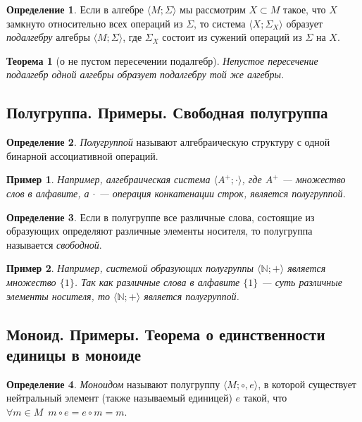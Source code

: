 \documentclass{article}
\newtheorem*{theorem*}{Теорема}
\theoremstyle{plain}
\newtheorem*{example*}{Пример}
\theoremstyle{definition}
\newtheorem{definition}{Определение}[subsection]
\begin{document}
\begin{definition}
	Если в алгебре \(\langle M; \Sigma \rangle\) мы рассмотрим \(X \subset M\) такое, что \(X\) замкнуто относительно всех операций из \(\Sigma\), то система \(\langle X; \Sigma_X \rangle\) образует \textit{подалгебру} алгебры \(\langle M; \Sigma \rangle\), где \(\Sigma_X\) состоит из сужений операций из \(\Sigma\) на \(X\).
\end{definition}

\begin{theorem*}[о не пустом пересечении подалгебр]
	Непустое пересечение подалгебр одной алгебры образует подалгебру той же алгебры.
\end{theorem*}

\subsection{Полугруппа. Примеры. Свободная полугруппа}

\begin{definition}
	\textit{Полугруппой} называют алгебраическую структуру с одной бинарной ассоциативной операций.
\end{definition}

\begin{example*}
	Например, алгебраическая система \(\langle A^+; \cdot \rangle\), где \(A^+\) — множество слов в алфавите, а \(\cdot\) — операция конкатенации строк, является полугруппой.
\end{example*}

\begin{definition}
	Если в полугруппе все различные слова, состоящие из образующих определяют различные элементы носителя, то полугруппа называется \textit{свободной}.
\end{definition}

\begin{example*}
	Например, системой образующих полугруппы \(\langle \mathbb{N}; + \rangle\) является множество \(\{1\}\). Так как различные слова в алфавите \(\{1\}\) — суть различные элементы носителя, то \(\langle \mathbb{N}; + \rangle\) является полугруппой.
\end{example*}

\subsection{Моноид. Примеры. Теорема о единственности единицы в моноиде}

\begin{definition}
	\textit{Моноидом} называют полугруппу \(\langle M; \circ, e\rangle\), в которой существует нейтральный элемент (также называемый единицей) \(e\) такой, что \(\forall m \in M \enspace m \circ e = e \circ m = m\).
\end{definition}
\end{document}

